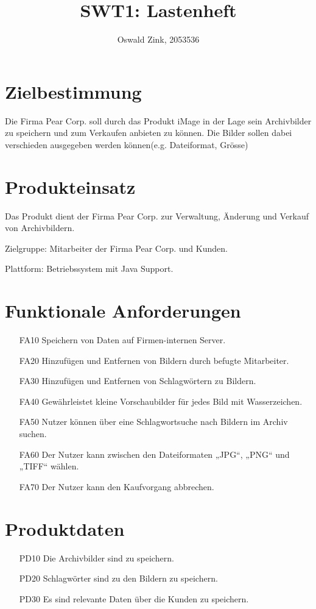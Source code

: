 \documentclass[parskip=full]{scrartcl}
\title{SWT1: Lastenheft}
\author{Oswald Zink, 2053536}
\begin{document}
\maketitle
\section{Zielbestimmung}
Die Firma Pear Corp. soll durch das Produkt iMage in der Lage sein Archivbilder zu speichern und zum Verkaufen anbieten zu k\"onnen. Die Bilder sollen dabei verschieden ausgegeben werden k\"onnen(e.g. Dateiformat, Gr\"osse)

\section{Produkteinsatz}
Das Produkt dient der Firma Pear Corp. zur Verwaltung, \"Anderung und Verkauf von Archivbildern.

Zielgruppe: Mitarbeiter der Firma Pear Corp. und Kunden.

Plattform: Betriebssystem mit Java Support.

\section{Funktionale Anforderungen}
\begin{itemize}[nosep]
\item[FA10] Speichern von Daten auf Firmen-internen Server.
\item[FA20] Hinzuf\"ugen und Entfernen von Bildern durch befugte Mitarbeiter.
\item[FA30] Hinzuf\"ugen und Entfernen von Schlagw\"ortern zu Bildern.
\item[FA40] Gew\"ahrleistet kleine Vorschaubilder f\"ur jedes Bild mit Wasserzeichen.
\item[FA50] Nutzer k\"onnen über eine Schlagwortsuche nach Bildern im Archiv suchen.
\item[FA60] Der Nutzer kann zwischen den Dateiformaten „JPG“, „PNG“ und „TIFF“ wählen.
\item[FA70] Der Nutzer kann den Kaufvorgang abbrechen.
\end{itemize}

\section{Produktdaten}
\begin{itemize}[nosep]
\item[PD10] Die Archivbilder sind zu speichern.
\item[PD20] Schlagw\"orter sind zu den Bildern zu speichern.
\item[PD30] Es sind relevante Daten \"uber die Kunden zu speichern.
\end{itemize}
\end{document}
